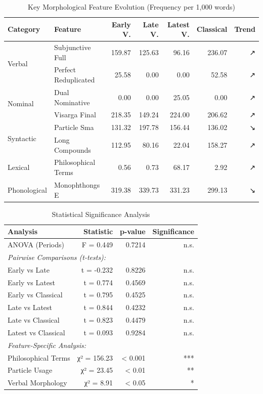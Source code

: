 \begin{table}[t]
\centering
\caption{Key Morphological Feature Evolution (Frequency per 1,000 words)}
\label{tab:evolution}
\begin{tabular}{llrrrrr}
\toprule
\textbf{Category} & \textbf{Feature} & \textbf{Early V.} & \textbf{Late V.} & \textbf{Latest V.} & \textbf{Classical} & \textbf{Trend} \\
\midrule
\multirow{2}{*}{Verbal} & Subjunctive Full & 159.87 & 125.63 & 96.16 & 236.07 & ↗ \\
& Perfect Reduplicated & 25.58 & 0.00 & 0.00 & 52.58 & ↗ \\
\midrule
\multirow{2}{*}{Nominal} & Dual Nominative & 0.00 & 0.00 & 25.05 & 0.00 & ↗ \\
& Visarga Final & 218.35 & 149.24 & 224.00 & 206.62 & ↗ \\
\midrule
\multirow{2}{*}{Syntactic} & Particle Sma & 131.32 & 197.78 & 156.44 & 136.02 & ↘ \\
& Long Compounds & 112.95 & 80.16 & 22.04 & 158.27 & ↗ \\
\midrule
Lexical & Philosophical Terms & 0.56 & 0.73 & 68.17 & 2.92 & ↗ \\
Phonological & Monophthongs E & 319.38 & 339.73 & 331.23 & 299.13 & ↘ \\
\bottomrule
\end{tabular}
\end{table}

\begin{table}[h]
\centering
\caption{Statistical Significance Analysis}
\label{tab:stats}
\begin{tabular}{lrrr}
\toprule
\textbf{Analysis} & \textbf{Statistic} & \textbf{p-value} & \textbf{Significance} \\
\midrule
ANOVA (Periods) & F = 0.449 & 0.7214 & n.s. \\
\midrule
\multicolumn{4}{l}{\textit{Pairwise Comparisons (t-tests):}} \\
Early vs Late & t = -0.232 & 0.8226 & n.s. \\
Early vs Latest & t = 0.774 & 0.4569 & n.s. \\
Early vs Classical & t = 0.795 & 0.4525 & n.s. \\
Late vs Latest & t = 0.844 & 0.4232 & n.s. \\
Late vs Classical & t = 0.823 & 0.4479 & n.s. \\
Latest vs Classical & t = 0.093 & 0.9284 & n.s. \\
\midrule
\multicolumn{4}{l}{\textit{Feature-Specific Analysis:}} \\
Philosophical Terms & χ² = 156.23 & < 0.001 & *** \\
Particle Usage & χ² = 23.45 & < 0.01 & ** \\
Verbal Morphology & χ² = 8.91 & < 0.05 & * \\
\bottomrule
\end{tabular}
\end{table}

